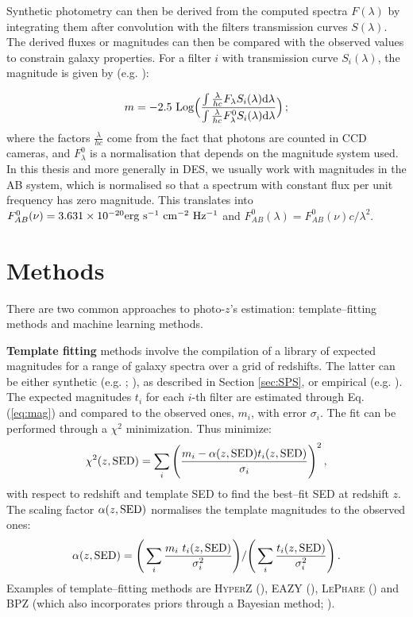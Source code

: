 Synthetic photometry can then be derived from the computed spectra $F(\lambda)$ by integrating them after convolution with the filters transmission curves $S(\lambda)$. The derived fluxes or magnitudes can then be compared with the observed values to constrain galaxy properties. For a filter $i$ with transmission curve $S_i(\lambda)$, the magnitude is given by (e.g. \citealt{girardi}):

\begin{equation}
m =  -2.5~{\rm Log}\Big( \frac{\int\frac{\lambda}{hc}F_\lambda S_i(\lambda){\rm d} \lambda}{\int\frac{\lambda}{hc}F^0_\lambda S_i(\lambda){\rm d} \lambda} \Big)\, ;\label{eq:mag}
\end{equation}
where the factors $\frac{\lambda}{hc}$ come from the fact that photons are counted in CCD cameras, and $F^0_\lambda$ is a normalisation that depends on the magnitude system used. In this thesis and more generally in DES, we usually work with magnitudes in the AB system, which is normalised so that a spectrum with constant flux per unit frequency has zero magnitude. This translates into $F^0_{AB}(\nu)=3.631\times 10^{-20} {\rm erg~s^{-1}~cm^{-2}~Hz^{-1}}$ and $F^0_{AB}(\lambda)=F^0_{AB}(\nu)c/\lambda^2$.

\section{Methods}\label{sec:zmethods}
There are two common approaches to photo-$z$'s  estimation: template--fitting methods and machine learning methods. 

{\bf Template fitting} methods involve the compilation of a library of expected magnitudes for a range of galaxy spectra over a grid of redshifts. The latter can be either synthetic (e.g. \citealt{bc03}; \citealt{fsps}), as described in Section \ref{sec:SPS}, or empirical (e.g. \citealt{cww}). The expected magnitudes $t_i$ for each $i$-th filter are estimated through Eq. (\ref{eq:mag}) and compared to the observed ones, $m_i$, with error $\sigma_i$. The fit can be performed through a $\chi^2$ minimization. Thus minimize:
\begin{equation}
\chi^2(z,{\rm SED})=\sum_i \Bigg( \frac{m_i-\alpha(z,{\rm SED}) t_i(z,{\rm SED}) }{\sigma_i} \Bigg)^2 \,,
\end{equation}
with respect to redshift and template SED to find the best--fit SED at redshift $z$. The scaling factor $\alpha(z,{\rm SED})$ normalises the template magnitudes to the observed ones:
\begin{equation}
\alpha (z,{\rm SED})=\Bigg( \sum_i \frac{m_i~t_i(z,{\rm SED}) }{\sigma_i^2} \Bigg)/ \Bigg( \sum_i  \frac{t_i(z,{\rm SED}) }{\sigma_i^2} \Bigg) \,.
\end{equation}
Examples of template--fitting methods are \textsc{HyperZ} (\citealt{hyperz}), \textsc{EAZY} (\citealt{eazy}), \textsc{LePhare} (\citealt{ilbertlephare}) and BPZ (which also incorporates priors through a Bayesian method; \citealt{bpz}).

